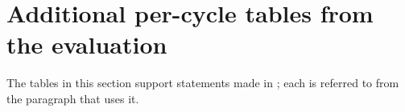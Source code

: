 \begin{table}[!htbp]
\label{tab:app-per-cycle-memory}
\end{table}

\section{Additional per-cycle tables from the evaluation}
\label{app:extra-tables}

The tables in this section support statements made in ; each is referred to from the paragraph that uses it.



















\FloatBarrier
